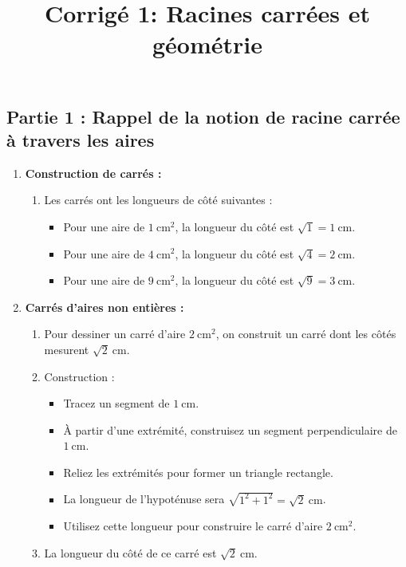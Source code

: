 \documentclass{article}
\title{Corrigé 1: Racines carrées et géométrie}
\author{}
\date{}
\begin{document}
\maketitle

\subsection*{Partie 1 : Rappel de la notion de racine carrée à travers les aires}

\begin{enumerate}
    \item \textbf{Construction de carrés :}
    \begin{enumerate}
        \item Les carrés ont les longueurs de côté suivantes :
        \begin{itemize}
            \item Pour une aire de $1~\text{cm}^2$, la longueur du côté est $\sqrt{1} = 1~\text{cm}$.
            \item Pour une aire de $4~\text{cm}^2$, la longueur du côté est $\sqrt{4} = 2~\text{cm}$.
            \item Pour une aire de $9~\text{cm}^2$, la longueur du côté est $\sqrt{9} = 3~\text{cm}$.
        \end{itemize}
    \end{enumerate}
    \item \textbf{Carrés d'aires non entières :}
    \begin{enumerate}
        \item Pour dessiner un carré d'aire $2~\text{cm}^2$, on construit un carré dont les côtés mesurent $\sqrt{2}~\text{cm}$.
        \item Construction :
        \begin{itemize}
            \item Tracez un segment de $1~\text{cm}$.
            \item À partir d'une extrémité, construisez un segment perpendiculaire de $1~\text{cm}$.
            \item Reliez les extrémités pour former un triangle rectangle.
            \item La longueur de l'hypoténuse sera $\sqrt{1^2 + 1^2} = \sqrt{2}~\text{cm}$.
            \item Utilisez cette longueur pour construire le carré d'aire $2~\text{cm}^2$.
        \end{itemize}
        \item La longueur du côté de ce carré est $\sqrt{2}~\text{cm}$.
    \end{enumerate}
\end{enumerate}
\end{document}
